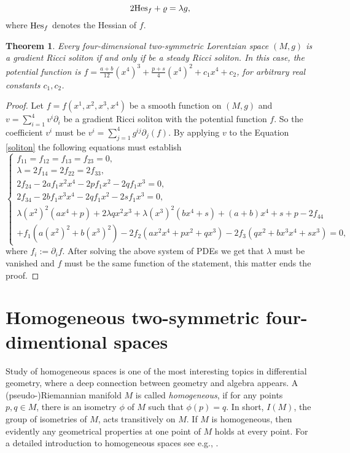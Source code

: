 \documentclass[11pt,oneside,leqno]{amsart}
\theoremstyle{plain}
\newtheorem{theorem}{Theorem}[section]
\begin{document}
$$
2{\rm Hes}_f  +\varrho =  \lambda g,
$$
where ${\rm Hes}_f$ denotes the Hessian of $f$.
\vspace{.3cm}
\begin{theorem}
Every  four-dimensional two-symmetric Lorentzian space $(M,g)$ is a gradient Ricci soliton if and only if be a steady Ricci soliton. In this case, the potential function is $f=\frac{a+b}{12}(x^4)^3+\frac{p+s}{4}(x^4)^2+c_1x^4+c_2$, for arbitrary real constants $c_1,c_2$.
\end{theorem}
\begin{proof}
Let $f=f(x^1,x^2,x^3,x^4)$ be a smooth function on $(M,g)$ and $v=\sum_{i=1}^4v^i{\partial}_i$ be a gradient Ricci soliton with the potential function $f$. So the coefficient $v^i$ must be $v^i = \sum_{j=1}^4g^{ij}\partial_j(f)$. By applying $v$ to the Equation \eqref{soliton} the following equations must establish
$$\left\{
\begin{array}{l}
f_{11}=f_{12}=f_{13}=f_{23}=0,\\
\lambda=2f_{14}=2f_{22}=2f_{33},\\
2f_{24}-2af_1 x^2x^4-2pf_1x^2-2qf_1x^3=0,\\
2f_{34}-2bf_1x^3x^4-2qf_1x^2-2sf_1x^3=0,\\
\lambda(x^2)^{2}(ax^4+p)+2\lambda qx^2x^3+\lambda(x^3)^{2}(bx^4+s)+(a+b)x^4+s+p-2f_{44}\\
+f_1(a(x^2)^{2}+b(x^3)^{2})-2f_2(ax^2x^4+px^2+qx^3)-2f_3(qx^2+bx^3x^4+sx^3)=0,
\end{array}\right.
$$
where $f_{i}:={\partial}_if$. After solving the above system of PDEs we get that $\lambda$ must  be vanished  and $f$ must be the same function of the statement, this matter ends  the proof.
\end{proof}

\section{Homogeneous two-symmetric four-dimentional spaces}
Study of homogeneous spaces is one of the most interesting topics in differential geometry, where a deep connection between geometry and algebra appears. A (pseudo-)Riemannian manifold $M$ is called {\em homogeneous}, if for any points $p,q\in M$, there is an isometry $\phi$ of $M$ such that $\phi(p)=q$. In short, $I(M)$, the group of isometries of $M$, acts transitively on $M$. If $M$ is homogeneous, then evidently any geometrical properties at one point of $M$ holds at every point. For a detailed introduction to homogeneous spaces see e.g., \cite{SH,SK,AW}.
\end{document}
